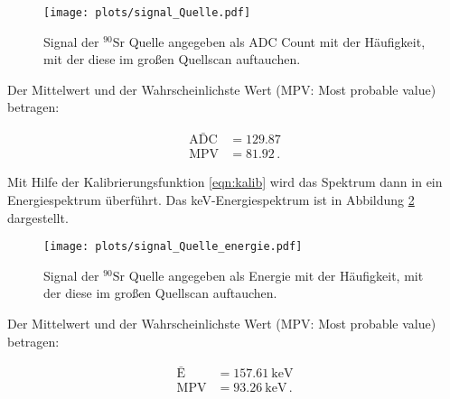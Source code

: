 \begin{figure}[H]
  \centering
  \texttt{[image: plots/signal\_Quelle.pdf]}
  \caption{Signal der $^{90}\text{Sr}$ Quelle angegeben als ADC Count mit 
  der Häufigkeit, mit der diese im großen Quellscan auftauchen.}
  \label{fig:ADCSpektrum}
\end{figure}

Der Mittelwert und der Wahrscheinlichste Wert (MPV: Most probable 
value) betragen:

\begin{align*}
    \bar{\text{ADC}} &= 129.87 \\ 
    \text{MPV} &= 81.92 \, .
\end{align*}

Mit Hilfe der Kalibrierungsfunktion \eqref{eqn:kalib} wird das Spektrum 
dann in ein Energiespektrum überführt. Das keV-Energiespektrum ist in Abbildung 
\ref{fig:Energiespektrum} dargestellt.

\begin{figure}[H]
  \centering
  \texttt{[image: plots/signal\_Quelle\_energie.pdf]}
  \caption{Signal der $^{90}\text{Sr}$ Quelle angegeben als Energie mit 
  der Häufigkeit, mit der diese im großen Quellscan auftauchen.}
  \label{fig:Energiespektrum}
\end{figure}

Der Mittelwert und der Wahrscheinlichste Wert (MPV: Most probable 
value) betragen:

\begin{align*}
    \bar{\text{E}} &= \SI{157.61}{\kilo\electronvolt} \\ 
    \text{MPV} &= \SI{93.26}{\kilo\electronvolt} \, .
\end{align*}
